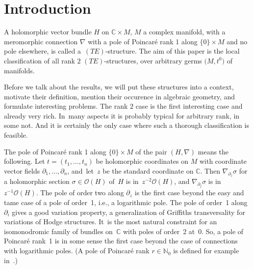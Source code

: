 \documentclass[pdftex]{sigma}%
\numberwithin{equation}{section}
\numberwithin{figure}{section}
\newcommand{\N}{{\mathbb N}}
\newcommand{\C}{{\mathbb C}}
\newcommand{\OO}{{\mathcal O}}
\newcommand{\paa}{\partial}
\newcommand{\nnn}{\nabla}
\begin{document}


\tableofcontents

\renewcommand{\thefootnote}{\arabic{footnote}}
\setcounter{footnote}{0}

\section{Introduction}%

A holomorphic vector bundle $H$ on $\C\times M$, $M$ a complex
manifold, with a meromorphic connection $\nnn$ with a
pole of Poincar\'e rank 1 along $\{0\}\times M$ and no pole
elsewhere, is called a~$(TE)$-structure.
The aim of this paper is the local classification of all rank $2$
$(TE)$-structures, over arbitrary germs $\big(M,t^0\big)$ of manifolds.

Before we talk about the results, we will put these structures
into a context, motivate their definition,
mention their occurence in algebraic geometry,
and formulate interesting problems.
The rank $2$ case is the first interesting case and already
very rich. In~many aspects it is probably typical for
arbitrary rank, in some not. And it is certainly the only
case where such a thorough classification is feasible.

The pole of Poincar\'e rank 1 along $\{0\}\times M$ of the
pair $(H,\nnn)$ means the following. Let $t=(t_1,\dots ,t_n)$
be holomorphic coordinates on $M$ with coordinate
vector fields $\paa_1,\dots ,\paa_n$, and~let~$z$ be the standard
coordinate on $\C$. Then $\nnn_{\paa_z}\sigma$ for a
holomorphic section $\sigma\in\OO(H)$ of~$H$
is in~$z^{-2}\OO(H)$, and $\nnn_{\paa_j}\sigma$ is in
$z^{-1}\OO(H)$. The pole of order two along $\paa_z$
is the first case beyond the easy and tame case of a
pole of order~1, i.e., a logarithmic pole.
The pole of order~1 along~$\paa_i$ gives a good variation
property, a generalization of Griffiths transversality
for variations of Hodge structures. It~is the most natural
constraint for an isomonodromic family of bundles on~$\C$
with poles of order~2 at~$0$.
So, a pole of Poincar\'e rank~1 is in some sense the first
case beyond the case of connections with logarithmic poles.
(A pole of Poincar\'e rank $r\in\N_0$
is defined for example in~\cite[Section~0.14]{Sa02}.)
\end{document}
